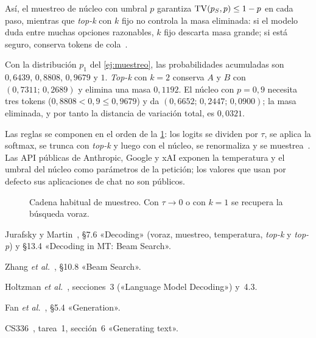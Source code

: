 Así, el muestreo de núcleo con umbral $p$ garantiza $\operatorname{TV}(p_S,p)\le 1-p$ en cada paso, mientras que \emph{top-k} con $k$ fijo no controla la masa eliminada: si el modelo duda entre muchas opciones razonables, $k$ fijo descarta masa grande; si está seguro, conserva tokens de cola~\cite[§3.2]{holtzman}.

\begin{ejemplo}\label{ej:truncamiento}
Con la distribución $p_1$ del \cref{ej:muestreo}, las probabilidades acumuladas son $0{,}6439$, $0{,}8808$, $0{,}9679$ y $1$. \emph{Top-k} con $k=2$ conserva $A$ y $B$ con $(0{,}7311;\allowbreak\,0{,}2689)$ y elimina una masa $0{,}1192$. El núcleo con $p=0{,}9$ necesita tres tokens ($0{,}8808<0{,}9\le 0{,}9679$) y da $(0{,}6652;\allowbreak\,0{,}2447;\allowbreak\,0{,}0900)$; la masa eliminada, y por tanto la distancia de variación total, es $0{,}0321$.
\end{ejemplo}

\begin{observacion}
Las reglas se componen en el orden de la \cref{fig:cadena-muestreo}: los logits se dividen por $\tau$, se aplica la softmax, se trunca con \emph{top-k} y luego con el núcleo, se renormaliza y se muestrea~\cite[§7.6.4]{jm3}. Las API públicas de Anthropic, Google y xAI exponen la temperatura y el umbral del núcleo como parámetros de la petición; los valores que usan por defecto sus aplicaciones de chat no son públicos.
\end{observacion}

\begin{figure}[h]
\centering
{}
\caption{Cadena habitual de muestreo. Con $\tau\to 0$ o con $k=1$ se recupera la búsqueda voraz.}
\label{fig:cadena-muestreo}
\end{figure}

\begin{lecturas}
\item Jurafsky y Martin~\cite{jm3}, §7.6 «Decoding» (voraz, muestreo, temperatura, \emph{top-k} y \emph{top-p}) y §13.4 «Decoding in MT: Beam Search».
\item Zhang \emph{et al.}~\cite{d2l}, §10.8 «Beam Search».
\item Holtzman \emph{et al.}~\cite{holtzman}, secciones~3 («Language Model Decoding») y~4.3.
\item Fan \emph{et al.}~\cite{fan}, §5.4 «Generation».
\item CS336~\cite{cs336a1}, tarea~1, sección~6 «Generating text».
\end{lecturas}

